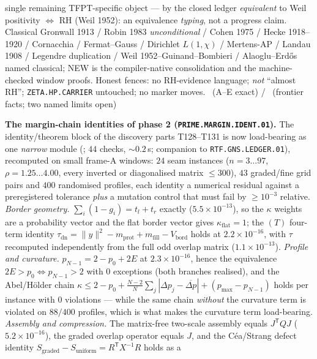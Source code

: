 \documentclass[11pt,a4paper]{article}
\theoremstyle{definition}
\begin{document}
single remaining TFPT-specific object --- by the closed ledger
\emph{equivalent} to Weil positivity $\Longleftrightarrow$ RH (Weil 1952): an
equivalence \emph{typing}, not a progress claim.
Classical Gronwall 1913 / Robin 1983 \emph{unconditional} / Cohen 1975 /
Hecke 1918--1920 / Cornacchia / Fermat--Gauss / Dirichlet $L(1,\chi)$ /
Mertens-AP / Landau 1908 / Legendre duplication / Weil 1952--Guinand--Bombieri
/ Alaoglu--Erd\H{o}s named classical; NEW is the compiler-native consolidation
and the machine-checked window proofs.
Honest fences: no RH-evidence language; \emph{not} ``almost RH'';
\texttt{ZETA.HP.CARRIER} untouched; no marker moves.
\mE\ (A--E exact) / \mC\ (frontier facts; two named limits open)

\par\smallskip\noindent\textbf{The margin-chain identities of phase 2
(\texttt{PRIME.MARGIN.IDENT.01}).}
The identity/theorem block of the discovery parts T128--T131 is now load-bearing
as one \emph{narrow} module (; $44$
checks, ${\sim}0.2$\,s; companion to \texttt{RTF.GNS.LEDGER.01}), recomputed on
small frame-A windows: $24$ seam instances ($n=3\ldots97$,
$\rho=1.25\ldots4.00$, every inverted or diagonalised matrix $\le300$), $43$
graded/fine grid pairs and $400$ randomised profiles, each identity a numerical
residual against a preregistered tolerance \emph{plus} a mutation control that
must fail by $\ge10^{-3}$ relative.
\emph{Border geometry.} $\sum_i(1-g_i)=t_l+t_r$ exactly
($5.5\times10^{-13}$), so the $\kappa$ weights are a probability vector and the
flat border vector gives $\kappa_{\mathrm{flat}}=1$; the $(T)$ four-term
identity $\tau_{\mathrm{dn}}=\|y\|^2-m_{\mathrm{prot}}+m_{\mathrm{fill}}-V_{\mathrm{bord}}$
holds at $2.2\times10^{-16}$, with $\tau$ recomputed independently from the full
odd overlap matrix ($1.1\times10^{-13}$).
\emph{Profile and curvature.} $p_{N-1}=2-p_0+2E$ at $2.3\times10^{-16}$, hence
the equivalence $2E>p_0\iff p_{N-1}>2$ with $0$ exceptions (both branches
realised), and the Abel/H\"older chain
$\kappa\le2-p_0+\frac{N-2}{N}\sum_j|\Delta p_j-\overline{\Delta p}|+(p_{\max}-p_{N-1})$
holds per instance with $0$ violations --- while the same chain \emph{without}
the curvature term is violated on $88/400$ profiles, which is what makes the
curvature term load-bearing.
\emph{Assembly and compression.} The matrix-free two-scale assembly equals
$J^{\mathsf T}QJ$ ($5.2\times10^{-16}$), the graded overlap operator equals $J$,
and the C\'ea/Strang defect identity
$S_{\mathrm{graded}}-S_{\mathrm{uniform}}=R^{\mathsf T}X^{-1}R$ holds as a
\end{document}
